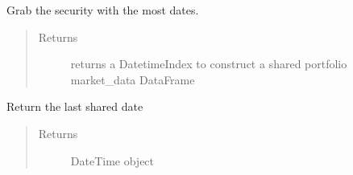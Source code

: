 \documentclass[letterpaper,10pt,english]{sphinxmanual}
\begin{document}
\begin{fulllineitems}
\begin{fulllineitems}
\begin{quote}
\begin{description}
\end{description}\end{quote}

\end{fulllineitems}


\begin{fulllineitems}
\label{\detokenize{securities:risk_dash.securities.Portfolio.get_date}}
\sphinxAtStartPar
Grab the security with the most dates.
\begin{quote}\begin{description}
\item[{Returns}] \leavevmode
\sphinxAtStartPar
returns a DatetimeIndex to construct a shared portfolio market\_data DataFrame

\end{description}\end{quote}

\end{fulllineitems}


\begin{fulllineitems}
\label{\detokenize{securities:risk_dash.securities.Portfolio.get_last_shared_date}}
\sphinxAtStartPar
Return the last shared date
\begin{quote}\begin{description}
\item[{Returns}] \leavevmode
\sphinxAtStartPar
DateTime object

\end{description}\end{quote}

\end{fulllineitems}



\end{fulllineitems}
\end{document}

